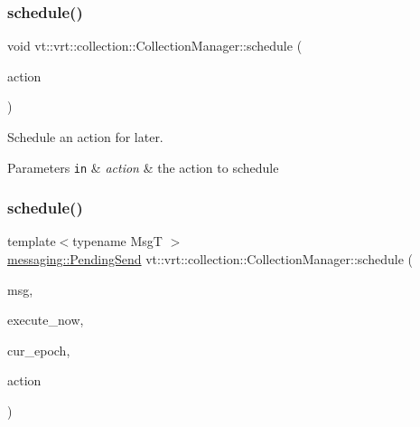 \subsubsection{\texorpdfstring{schedule()}{schedule()}\hspace{0.1cm}{\footnotesize\ttfamily [1/2]}}
{\footnotesize\ttfamily void vt\+::vrt\+::collection\+::\+Collection\+Manager\+::schedule (\begin{DoxyParamCaption}\item[{\hyperlink{namespacevt_ae0a5a7b18cc99d7b732cb4d44f46b0f3}{Action\+Type}}]{action }\end{DoxyParamCaption})\hspace{0.3cm}{\ttfamily [private]}}



Schedule an action for later. 


\begin{DoxyParams}[1]{Parameters}
\mbox{\tt in}  & {\em action} & the action to schedule \\
\hline
\end{DoxyParams}
\mbox{\label{structvt_1_1vrt_1_1collection_1_1_collection_manager_aaa19d241c982123103147b568f97b842}} 
\subsubsection{\texorpdfstring{schedule()}{schedule()}\hspace{0.1cm}{\footnotesize\ttfamily [2/2]}}
{\footnotesize\ttfamily template$<$typename MsgT $>$ \\
\hyperlink{structvt_1_1messaging_1_1_pending_send}{messaging\+::\+Pending\+Send} vt\+::vrt\+::collection\+::\+Collection\+Manager\+::schedule (\begin{DoxyParamCaption}\item[{MsgT}]{msg,  }\item[{bool}]{execute\+\_\+now,  }\item[{\hyperlink{namespacevt_a985a5adf291c34a3ca263b3378388236}{Epoch\+Type}}]{cur\+\_\+epoch,  }\item[{\hyperlink{namespacevt_ae0a5a7b18cc99d7b732cb4d44f46b0f3}{Action\+Type}}]{action }\end{DoxyParamCaption})\hspace{0.3cm}{\ttfamily [private]}}




